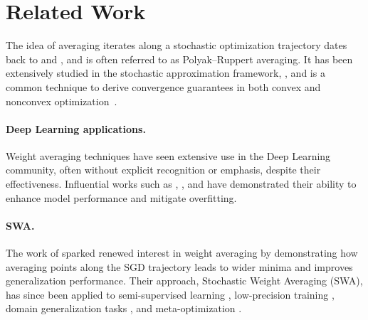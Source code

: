 \section{Related Work}
\label{sec:related_work}

The idea of averaging iterates along a stochastic optimization trajectory dates back to \citet{polyak_new_1990} and \citet{david_ruppert_efficient_1988}, and is often referred to as Polyak–Ruppert averaging.
It has been extensively studied in the stochastic approximation framework, \citep{polyak_acceleration_1992, bach_non-strongly-convex_2013, neu_iterate_2018, lakshminarayanan_linear_2018}, and is a common technique to derive convergence guarantees in both convex and nonconvex optimization~\citep{garrigos2023handbook}. 

\vspace{-2mm}
\paragraph{Deep Learning applications.}
Weight averaging techniques have seen extensive use in the Deep Learning community, often without explicit recognition or emphasis, despite their effectiveness. Influential works such as \citet{szegedy_2016_rethinking}, \citet{vaswani2017attention}, and \citet{merity2017regularizingoptimizinglstmlanguage} have demonstrated their ability to enhance model performance and mitigate overfitting.


\vspace{-2mm}
\paragraph{SWA.}
The work of \citet{izmailov_averaging_2019} sparked renewed interest in weight averaging by demonstrating how averaging points along the SGD trajectory leads to wider minima and improves generalization performance. Their approach, Stochastic Weight Averaging (SWA), has since been applied to semi-supervised learning \citep{tarvainen2018meanteachersbetterrole, athiwaratkun_there_2018}, low-precision training \citep{yang_swalp_2019}, domain generalization tasks \citep{cha_swad_2021}, and meta-optimization \citep{li_trainable_2022}.

\vspace{-2mm}
